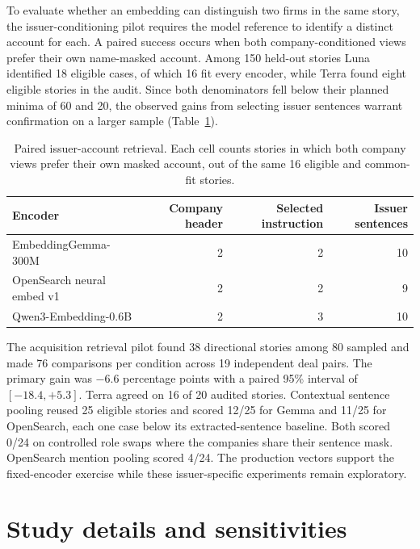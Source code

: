 To evaluate whether an embedding can distinguish two firms in the same
story, the issuer-conditioning pilot requires the model reference to
identify a distinct account for each. A paired success occurs when both
company-conditioned views prefer their own name-masked account. Among
150 held-out stories Luna identified 18 eligible cases, of which 16 fit
every encoder, while Terra found eight eligible stories in the audit.
Since both denominators fell below their planned minima of 60 and 20,
the observed gains from selecting issuer sentences warrant confirmation
on a larger sample (Table~\ref{tab:app-vectors}).

\begin{table}[t]
  \centering
  \small
  \caption{Paired issuer-account retrieval. Each cell counts stories in
    which both company views prefer their own masked account, out of the
  same 16 eligible and common-fit stories.}
  \label{tab:app-vectors}
  \begin{tabular}{lrrr}
    \toprule
    Encoder & Company header & Selected instruction & Issuer sentences \\
    \midrule
    EmbeddingGemma-300M & 2 & 2 & 10 \\
    OpenSearch neural embed v1 & 2 & 2 & 9 \\
    Qwen3-Embedding-0.6B & 2 & 3 & 10 \\
    \bottomrule
  \end{tabular}
\end{table}

The acquisition retrieval pilot found 38 directional stories among 80
sampled and made 76 comparisons per condition across 19 independent
deal pairs. The primary gain was $-6.6$ percentage points with a paired
95\% interval of $[-18.4,+5.3]$. Terra agreed on 16 of 20 audited stories.
Contextual sentence pooling reused 25 eligible stories and scored
12/25 for Gemma and 11/25 for OpenSearch, each one case below its
extracted-sentence baseline. Both scored 0/24 on controlled role swaps
where the companies share their sentence mask. OpenSearch mention
pooling scored 4/24. The production vectors support the fixed-encoder
exercise while these issuer-specific experiments remain exploratory.

\section{Study details and sensitivities}
\label{sec:app-studies}

